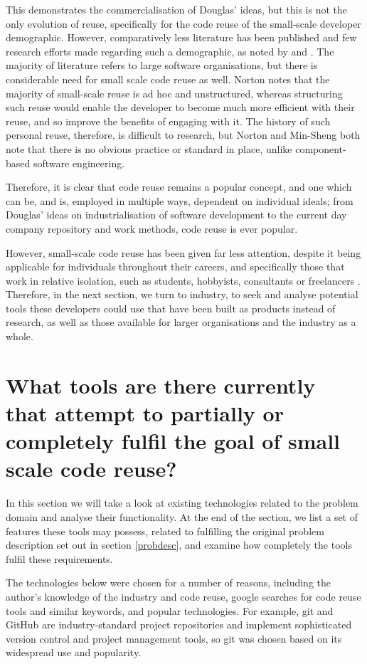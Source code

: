 This demonstrates the commercialisation of Douglas' ideas, but this is not the only evolution of reuse, specifically for the  code reuse of the small-scale developer demographic.
However, comparatively less literature has been published and few research efforts made regarding such a demographic, as noted by \cite{Norton2003a} and \cite{Hsieh2006}. 
The majority of literature refers to large software organisations, but there is considerable need for small scale code reuse as well. 
Norton notes that the majority of small-scale reuse is ad hoc and unstructured, whereas structuring such reuse would enable the developer to become much more efficient with their reuse, and so improve the benefits of engaging with it.
The history of such personal reuse, therefore, is difficult to research, but Norton and Min-Sheng both note that there is no obvious practice or standard in place, unlike component-based software engineering.

Therefore, it is clear that code reuse remains a popular concept, and one which can be, and is, employed in multiple ways, dependent on individual ideals; from Douglas' ideas on industrialisation of software development to the current day company repository and work methods, code reuse is ever popular. 

However, small-scale code reuse has been given far less attention, despite it being applicable for individuals throughout their careers, and specifically those that work in relative isolation, such as students, hobbyists, consultants or freelancers \cite{Norton2003a}. 
Therefore, in the next section, we turn to industry, to seek and analyse potential tools these developers could use that have been built as products instead of research, as well as those available for larger organisations and the industry as a whole.

\section{What tools are there currently that attempt to partially or completely fulfil the goal of small scale code reuse?}
In this section we will take a look at existing technologies related to the problem domain and analyse their functionality. 
At the end of the section, we list a set of features these tools may possess, related to fulfilling the original problem description set out in section \ref{probdesc}, and examine how completely the tools fulfil these requirements.

The technologies below were chosen for a number of reasons, including the author's knowledge of the industry and code reuse, google searches for code reuse tools and similar keywords, and popular technologies. 
For example, git and GitHub are industry-standard project repositories and implement sophisticated version control and project management tools, so git was chosen based on its widespread use and popularity.

